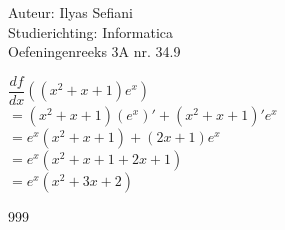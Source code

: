 \documentclass[a4paper]{article}
\begin{document}
\noindent \large Auteur: Ilyas Sefiani \\
\noindent \large Studierichting: Informatica\\
\noindent \large Oefeningenreeks 3A nr. 34.9\\

\medskip

\normalsize

$\dfrac{df}{dx}((x^2+x+1)e^x)$\\

$= (x^2+x+1)(e^x)'+(x^2+x+1)'e^x$\\

$= e^x(x^2+x+1)+(2x+1)e^x$\\  

$= e^x(x^2+x+1+2x+1)$\\

$= e^x(x^2+3x+2)$\\   

\begin{thebibliography}{999}
\end{thebibliography}
\end{document}
